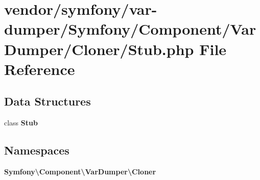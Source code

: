 \section{vendor/symfony/var-\/dumper/\+Symfony/\+Component/\+Var\+Dumper/\+Cloner/\+Stub.php File Reference}
\label{symfony_2var-dumper_2_symfony_2_component_2_var_dumper_2_cloner_2_stub_8php}
\subsection*{Data Structures}
\begin{DoxyCompactItemize}
\item 
class {\bf Stub}
\end{DoxyCompactItemize}
\subsection*{Namespaces}
\begin{DoxyCompactItemize}
\item 
 {\bf Symfony\textbackslash{}\+Component\textbackslash{}\+Var\+Dumper\textbackslash{}\+Cloner}
\end{DoxyCompactItemize}
